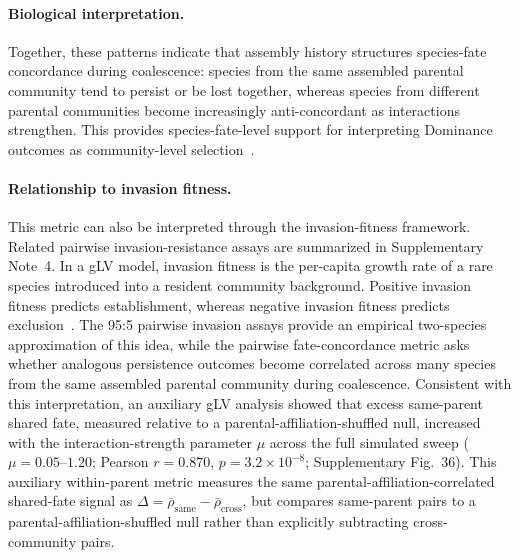 \paragraph{Biological interpretation.}
Together, these patterns indicate that assembly history structures species-fate concordance during coalescence: species from the same assembled parental community tend to persist or be lost together, whereas species from different parental communities become increasingly anti-concordant as interactions strengthen. This provides species-fate-level support for interpreting Dominance outcomes as community-level selection~\citep{Tikhonov2016,DiazColunga2022,Mansour2018,Rillig2015}.

\paragraph{Relationship to invasion fitness.}
This metric can also be interpreted through the invasion-fitness framework. Related pairwise invasion-resistance assays are summarized in Supplementary Note~4. In a gLV model, invasion fitness is the per-capita growth rate of a rare species introduced into a resident community background. Positive invasion fitness predicts establishment, whereas negative invasion fitness predicts exclusion~\citep{Hu2025,Kurkjian2021}. The 95:5 pairwise invasion assays provide an empirical two-species approximation of this idea, while the pairwise fate-concordance metric asks whether analogous persistence outcomes become correlated across many species from the same assembled parental community during coalescence. Consistent with this interpretation, an auxiliary gLV analysis showed that excess same-parent shared fate, measured relative to a parental-affiliation-shuffled null, increased with the interaction-strength parameter $\mu$ across the full simulated sweep ($\mu = 0.05$--$1.20$; Pearson $r = 0.870$, $p = 3.2 \times 10^{-8}$; Supplementary Fig.~36). This auxiliary within-parent metric measures the same parental-affiliation-correlated shared-fate signal as $\Delta=\bar{\rho}_{\text{same}}-\bar{\rho}_{\text{cross}}$, but compares same-parent pairs to a parental-affiliation-shuffled null rather than explicitly subtracting cross-community pairs.
